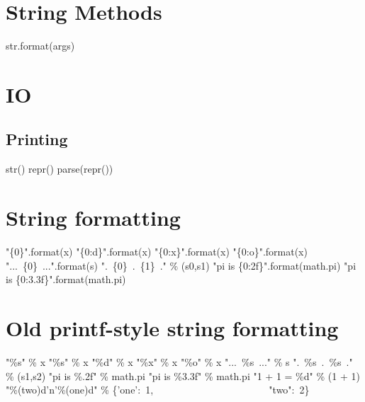 \documentclass{refcard}
\begin{document}
\section{String Methods}

\begin{ldesc}
	 str.format(args)
\end{ldesc}


\section{IO}

\subsection{Printing}

\begin{ldesc}
	          str()
	 repr()
	\li[identity of \I{x}]                          parse(repr())
\end{ldesc}


\section{String formatting}

\begin{ldesc}
	 "\{0\}".format(x)
	     "\{0:d\}".format(x)
	 "\{0:x\}".format(x)
	       "\{0:o\}".format(x)
	\li[replace \C{\{0\}} by \I{s}] "...~\{0\}~...".format(s)
	  ".~\{0\}~.~\{1\}~." \% (s0,s1)
	\li[generate \C{"pi is 3.14"}]    "pi is \{0:2f\}".format(math.pi)
	\li[generate \C{"pi is 003.141"}] "pi is \{0:3.3f\}".format(math.pi)
\end{ldesc}


\section{Old printf-style string formatting}

\begin{ldesc}
	 "\%s" \% x
	 "\%s" \% x
	     "\%d" \% x
	 "\%x" \% x
	       "\%o" \% x
	\li[replace \C{\%s} by \I{s}] "...~\%s~..." \% s
	  ".~\%s~.~\%s~." \% (s1,s2)
	\li[generate \C{"pi is 3.14"}] "pi is \%.2f" \% math.pi
	\li[generate \C{"pi is 003.141"}] "pi is \%3.3f" \% math.pi
	\li[generate \C{"1 + 1 = 2"}] "1 + 1 = \%d" \% (1 + 1)
	\li[generate \C{"2'n'1"}] "\%(two)d'n'\%(one)d" \% \{'one':~1, \li
	                              ~~~~~~~~~~~~~~~~~~~~~~ "two":~2\}
\end{ldesc}
\end{document}
